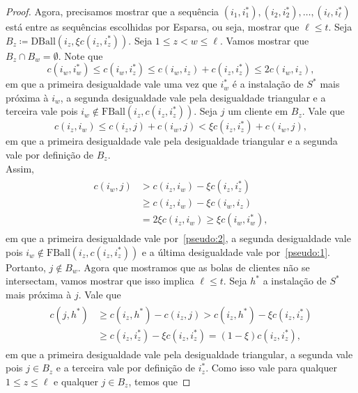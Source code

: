 \begin{proof}
    Agora, precisamos mostrar que a sequência $(i_1,i_1^*), (i_2,i_2^*), \ldots, (i_{\ell},i_{\ell}^*)$ está entre as sequências escolhidas por {\sc Esparsa}, ou seja, mostrar que $\ell \leq t$. Seja ${B_z \coloneqq \text{DBall}(i_z,\xi c(i_z,i_z^*))}$. Seja $1 \leq z < w \leq \ell$. Vamos mostrar que $B_z \cap B_w = \emptyset$. 
    Note que 
    \begin{equation}
        c(i_w,i_w^*) \leq c(i_w,i_z^*) \leq c(i_w,i_z) + c(i_z,i_z^*) \leq 2 c(i_w,i_z), \label{pseudo:1}
    \end{equation}
    em que a primeira desigualdade vale uma vez que $i_w^*$ é a instalação de $S^*$ mais próxima à $i_w$, a segunda desigualdade vale pela desigualdade triangular e a terceira vale pois $i_w \not \in \text{FBall}(i_z,c(i_z,i_z^*))$. Seja $j$ um cliente em $B_z$.
    Vale que
    \begin{equation}
        c(i_z,i_w) \leq c(i_z,j) + c(i_w,j) < \xi c(i_z,i_z^*) + c(i_w,j), \label{pseudo:2}
    \end{equation}
    em que a primeira desigualdade vale pela desigualdade triangular e a segunda vale por definição de $B_z$. \\
    Assim,
        \begin{align}
            \begin{split}\nonumber
        c(i_w,j) &> c(i_z,i_w) - \xi c(i_z,i_z^*) \\
        &\geq c(i_z,i_w) - \xi c (i_w,i_z) \\
        &= 2\xi c(i_z,i_w) \geq \xi c(i_w,i_w^*),
            \end{split}
        \end{align}
    em que a primeira desigualdade vale por~\eqref{pseudo:2}, a segunda desigualdade vale pois ${i_w \not \in \text{FBall}(i_z,c(i_z,i_z^*))}$ e a última desigualdade vale por~\eqref{pseudo:1}.
    Portanto, $j \not \in B_w$. Agora que mostramos que as bolas de clientes não se intersectam, vamos mostrar que isso implica $\ell \leq t$. Seja $h^*$ a instalação de $S^*$ mais próxima à $j$. Vale que
        \begin{align}
            \begin{split} \nonumber
            c(j,h^*) &\geq c(i_z,h^*) - c(i_z,j) > c(i_z,h^*) - \xi c(i_z,i_z^*) \\
            &\geq c(i_z,i_z^*) - \xi c(i_z,i_z^*) = (1 - \xi) c(i_z,i_z^*),
            \end{split}
        \end{align}
    em que a primeira desigualdade vale pela desigualdade triangular, a segunda vale pois $j \in B_z$ e a terceira vale por definição de $i_z^*$. Como isso vale para qualquer $1 \leq z\leq \ell$ e qualquer $j \in B_z$, temos que

\end{proof}
